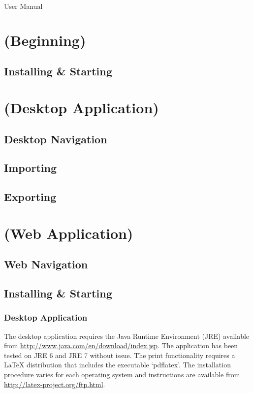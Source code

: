User Manual

\tableofcontents

\chapter{(Beginning)}
\section{Installing \& Starting}

\chapter{(Desktop Application)}
\section{Desktop Navigation}
\section{Importing}
\section{Exporting}

\chapter{(Web Application)}
\section{Web Navigation}

\section{Installing \& Starting}
\subsection{Desktop Application}

The desktop application requires the Java Runtime Environment (JRE) available from \url{http://www.java.com/en/download/index.jsp}. The application has been tested on JRE 6 and JRE 7 without issue. The print functionality requires a LaTeX distribution that includes the executable `pdflatex'. The installation procedure varies for each operating system and instructions are available from \url{http://latex-project.org/ftp.html}.

